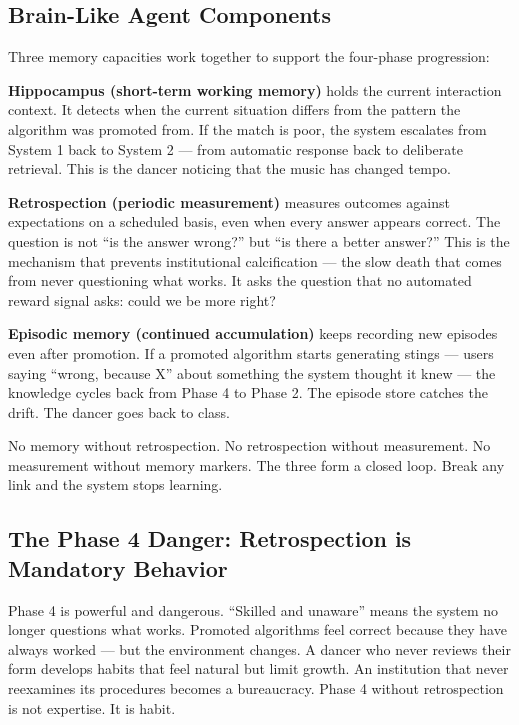 \documentclass[11pt,a4paper]{article}
\begin{document}
\subsection{Brain-Like Agent Components}

Three memory capacities work together to support the four-phase progression:

\textbf{Hippocampus (short-term working memory)} holds the current interaction context. It detects when the current situation differs from the pattern the algorithm was promoted from. If the match is poor, the system escalates from System 1 back to System 2 --- from automatic response back to deliberate retrieval. This is the dancer noticing that the music has changed tempo.

\textbf{Retrospection (periodic measurement)} measures outcomes against expectations on a scheduled basis, even when every answer appears correct. The question is not ``is the answer wrong?'' but ``is there a better answer?'' This is the mechanism that prevents institutional calcification --- the slow death that comes from never questioning what works. It asks the question that no automated reward signal asks: could we be more right?

\textbf{Episodic memory (continued accumulation)} keeps recording new episodes even after promotion. If a promoted algorithm starts generating stings --- users saying ``wrong, because X'' about something the system thought it knew --- the knowledge cycles back from Phase 4 to Phase 2. The episode store catches the drift. The dancer goes back to class.

No memory without retrospection. No retrospection without measurement. No measurement without memory markers. The three form a closed loop. Break any link and the system stops learning.

\subsection{The Phase 4 Danger: Retrospection is Mandatory Behavior}

Phase 4 is powerful and dangerous. ``Skilled and unaware'' means the system no longer questions what works. Promoted algorithms feel correct because they have always worked --- but the environment changes. A dancer who never reviews their form develops habits that feel natural but limit growth. An institution that never reexamines its procedures becomes a bureaucracy. Phase 4 without retrospection is not expertise. It is habit.
\end{document}
